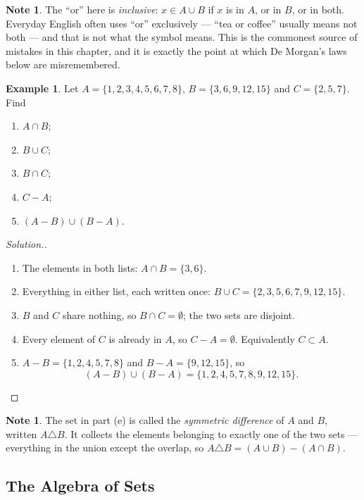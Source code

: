 \documentclass[11pt,a4paper]{article}
\theoremstyle{definition}
\newtheorem{example}[thm]{Example}
\newtheorem{note}[thm]{Note}
\newenvironment{solution}
  {\renewcommand{\qedsymbol}{}\begin{proof}[\textit{Solution}.]}
  {\end{proof}}
\begin{document}
\begin{note}
The ``or'' here is \emph{inclusive}: $x\in A\cup B$ if $x$ is in $A$, or in $B$, or
in both. Everyday English often uses ``or'' exclusively --- ``tea or coffee'' usually
means not both --- and that is not what the symbol means. This is the commonest
source of mistakes in this chapter, and it is exactly the point at which De
Morgan's laws below are misremembered.
\end{note}

\begin{example}
Let $A=\{1,2,3,4,5,6,7,8\}$, $B=\{3,6,9,12,15\}$ and $C=\{2,5,7\}$. Find
\begin{enumerate}
\item[(a).] $A\cap B$;
\item[(b).] $B\cup C$;
\item[(c).] $B\cap C$;
\item[(d).] $C-A$;
\item[(e).] $(A-B)\cup(B-A)$.
\end{enumerate}
\end{example}

\begin{solution}
\begin{enumerate}
\item[(a).] The elements in both lists: $A\cap B=\{3,6\}$.
\item[(b).] Everything in either list, each written once:
$B\cup C=\{2,3,5,6,7,9,12,15\}$.
\item[(c).] $B$ and $C$ share nothing, so $B\cap C=\emptyset$; the two sets are
disjoint.
\item[(d).] Every element of $C$ is already in $A$, so $C-A=\emptyset$. Equivalently
$C\subset A$.
\item[(e).] $A-B=\{1,2,4,5,7,8\}$ and $B-A=\{9,12,15\}$, so
$$(A-B)\cup(B-A)=\{1,2,4,5,7,8,9,12,15\}.$$
\end{enumerate}
\end{solution}

\begin{note}
The set in part (e) is called the \emph{symmetric difference} of $A$ and $B$,
written $A\triangle B$. It collects the elements belonging to exactly one of the
two sets --- everything in the union except the overlap, so
$A\triangle B=(A\cup B)-(A\cap B)$.
\end{note}

\subsection{The Algebra of Sets}
\end{document}

